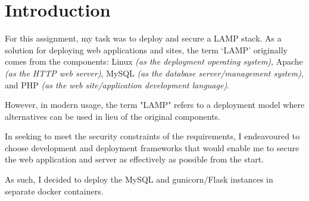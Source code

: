\section{Introduction}

For this assignment, my task was to deploy and secure a LAMP stack. As a solution for deploying web applications and sites, the term `LAMP' originally comes from the components: Linux \textit{(as the deployment operating system)}, Apache \textit{(as the HTTP web server)}, MySQL \textit{(as the database server/management system)}, and PHP \textit{(as the web site/application development language)}.

However, in modern usage, the term "LAMP" refers to a deployment model where alternatives can be used in lieu of the original components.

In seeking to meet the security constraints of the requirements, I endeavoured to choose development and deployment frameworks that would enable me to secure the web application and server as effectively as possible from the start.

As such, I decided to deploy the MySQL and gunicorn/Flask instances in separate docker containers.


